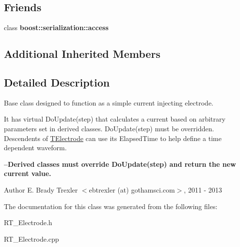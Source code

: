 \subsection*{Friends}
\begin{DoxyCompactItemize}
\item 
\hypertarget{class_t_electrode_ac98d07dd8f7b70e16ccb9a01abf56b9c}{class {\bfseries boost\+::serialization\+::access}}\label{class_t_electrode_ac98d07dd8f7b70e16ccb9a01abf56b9c}

\end{DoxyCompactItemize}
\subsection*{Additional Inherited Members}


\subsection{Detailed Description}
Base class designed to function as a simple current injecting electrode. 

It has virtual Do\+Update(step) that calculates a current based on arbitrary parameters set in derived classes. Do\+Update(step) must be overridden. Descendents of \hyperlink{class_t_electrode}{T\+Electrode} can use its Elapsed\+Time to help define a time dependent waveform.

{\bfseries  --Derived classes must override Do\+Update(step) and return the new current value. }

\begin{DoxyAuthor}{Author}
E. Brady Trexler $<$ebtrexler (at) gothamsci.\+com$>$, 2011 -\/ 2013 
\end{DoxyAuthor}


The documentation for this class was generated from the following files\+:\begin{DoxyCompactItemize}
\item 
R\+T\+\_\+\+Electrode.\+h\item 
R\+T\+\_\+\+Electrode.\+cpp\end{DoxyCompactItemize}
